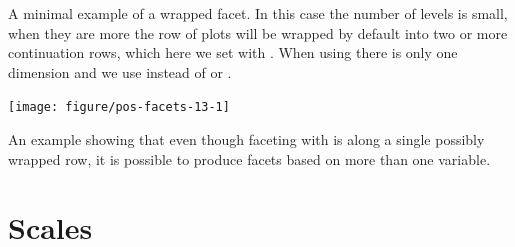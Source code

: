\documentclass[krantz2]{krantz}\usepackage{knitr}%
\begin{document}
A minimal example of a wrapped facet. In this case the number of levels is small, when they are more the row of plots will be wrapped by default into two or more continuation rows, which here we set with . When using  there is only one dimension and we use  instead of  or .



\begin{knitrout}\footnotesize
{}\color{fgcolor}\begin{kframe}
\begin{alltt}
 \hlopt{+} \hlstd{(} \hlstd{=}   \hlstd{=} \hlstd{)}
\end{alltt}
\end{kframe}

{\centering \texttt{[image: figure/pos-facets-13-1]} 

}



\end{knitrout}

An example showing that even though faceting with  is along a single possibly wrapped row, it is possible to produce facets based on more than one variable.

\begin{knitrout}\footnotesize
{}\color{fgcolor}\begin{kframe}
\begin{alltt}
 \hlopt{+} \hlstd{(} \hlstd{=}  \hlstd{=}\hlstd{,}  
\end{alltt}
\end{kframe}
\end{knitrout}


%
%

\section{Scales}\label{sec:plot:scales}
\end{document}
